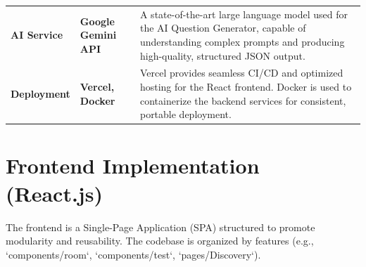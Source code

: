 \begin{longtable}{p{3cm} p{3cm} p{8cm}}
\textbf{AI Service} & \textbf{Google Gemini API} &
A state-of-the-art large language model used for the AI Question Generator, capable of understanding complex prompts and producing high-quality, structured JSON output. \\[0.5em]

\textbf{Deployment} & \textbf{Vercel, Docker} &
Vercel provides seamless CI/CD and optimized hosting for the React frontend.
Docker is used to containerize the backend services for consistent, portable deployment. \\[0.5em]

\end{longtable}


\section{Frontend Implementation (React.js)}
\label{sec:impl-frontend}
The frontend is a Single-Page Application (SPA) structured to promote modularity and reusability. The codebase is organized by features (e.g., `components/room`, `components/test`, `pages/Discovery`).

